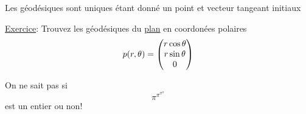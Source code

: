 Les géodésiques sont uniques étant donné un point et vecteur tangeant initiaux

\underline{Exercice}: Trouvez les géodésiques du \underline{plan} en coordonées polaires $$p(r,\theta) = \begin{pmatrix} r\cos\theta\\r\sin\theta\\0 \end{pmatrix}$$    


\begin{tcolorbox}[title=Fun fact]
	On ne sait pas si $$\pi^{\pi^{\pi^\pi}}$$ est un entier ou non!
\end{tcolorbox}



